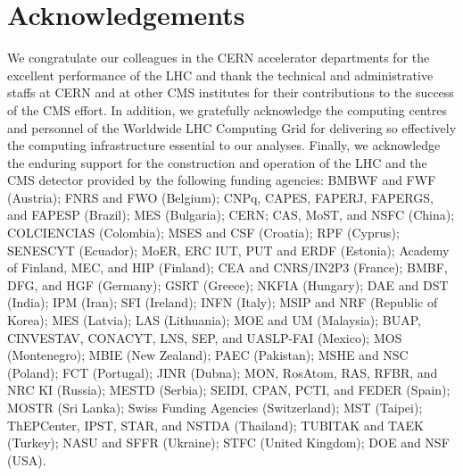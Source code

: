 \documentclass[submission, Proceedings]{SciPost}
\begin{document}
\section*{Acknowledgements}
We congratulate our colleagues in the CERN accelerator departments for the excellent performance of the LHC
and thank the technical and administrative staffs at CERN and at other CMS institutes for their contributions
to the success of the CMS effort. In addition, we gratefully acknowledge the computing centres and personnel
of the Worldwide LHC Computing Grid for delivering so effectively the computing infrastructure essential to
our analyses. Finally, we acknowledge the enduring support for the construction and operation of the LHC and
the CMS detector provided by the following funding agencies: BMBWF and FWF (Austria); FNRS and FWO (Belgium);
CNPq, CAPES, FAPERJ, FAPERGS, and FAPESP (Brazil); MES (Bulgaria); CERN; CAS, MoST, and NSFC (China);
COLCIENCIAS (Colombia); MSES and CSF (Croatia); RPF (Cyprus); SENESCYT (Ecuador); MoER, ERC IUT, PUT and ERDF
(Estonia); Academy of Finland, MEC, and HIP (Finland); CEA and CNRS/IN2P3 (France); BMBF, DFG, and HGF
(Germany); GSRT (Greece); NKFIA (Hungary); DAE and DST (India); IPM (Iran); SFI (Ireland); INFN (Italy); MSIP
and NRF (Republic of Korea); MES (Latvia); LAS (Lithuania); MOE and UM (Malaysia); BUAP, CINVESTAV, CONACYT,
LNS, SEP, and UASLP-FAI (Mexico); MOS (Montenegro); MBIE (New Zealand); PAEC (Pakistan); MSHE and NSC
(Poland); FCT (Portugal); JINR (Dubna); MON, RosAtom, RAS, RFBR, and NRC KI (Russia); MESTD (Serbia); SEIDI,
CPAN, PCTI, and FEDER (Spain); MOSTR (Sri Lanka); Swiss Funding Agencies (Switzerland); MST (Taipei);
ThEPCenter, IPST, STAR, and NSTDA (Thailand); TUBITAK and TAEK (Turkey); NASU and SFFR (Ukraine); STFC (United
Kingdom); DOE and NSF (USA).




\nolinenumbers
\end{document}
